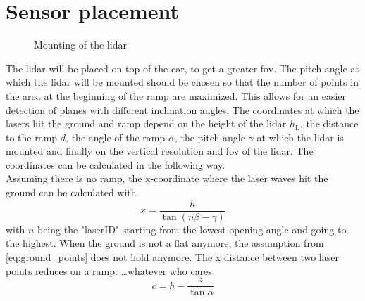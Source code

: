 \section{Sensor placement}
\begin{figure}[htpb]
	\centering
	
	\caption{Mounting of the \acrshort{lidar}}
	\label{fig:tikz_lidar_mount}
\end{figure}
The \gls{lidar} will be placed on top of the car, to get a greater \gls{fov}.
The pitch angle at which the \gls{lidar} will be mounted should be chosen so that the number of points in the area at the beginning of the ramp are maximized.
This allows for an easier detection of planes with different inclination angles.
The coordinates at which the lasers hit the ground and ramp depend on the height of the \gls{lidar} $ h_\mathrm{L} $, the distance to the ramp $d$, the angle of the ramp $\alpha$, the pitch angle $\gamma$ at which the \gls{lidar} is mounted and finally on the vertical resolution and \gls{fov} of the \gls{lidar}. The coordinates can be calculated in the following way.\\
Assuming there is no ramp, the x-coordinate where the laser waves hit the ground can be calculated with
\begin{equation}
	x = \frac{h}{\tan(n\beta - \gamma)}
	\label{eq:ground_points}
\end{equation}
with $n$ being the "laserID" starting from the lowest opening angle and going to the highest.
When the ground is not a flat anymore, the assumption from \ref{eq:ground_points} does not hold anymore. The x distance between two laser points reduces on a ramp.
\dots whatever who cares
\[ c = h - \frac{z}{\tan \alpha} \]



